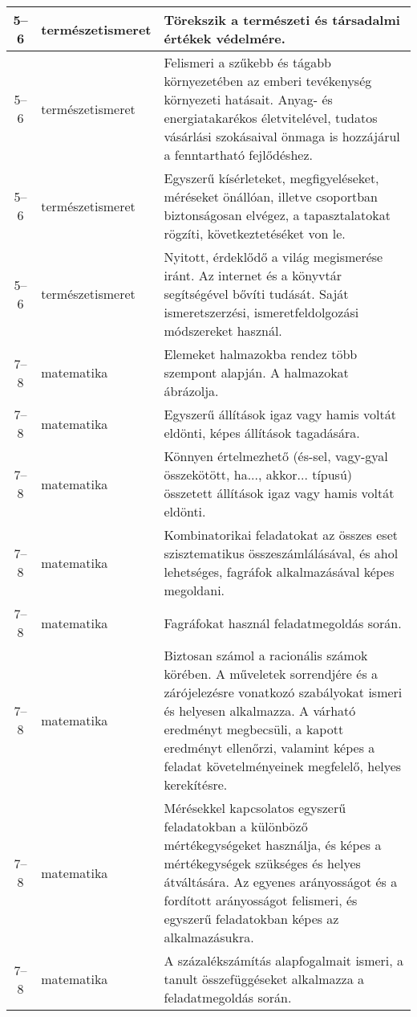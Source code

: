 \begin{small}
\begin{longtable}{c | p{2cm} |  p{11cm} }
              5--6 & természet\-ismeret & Törekszik a természeti és társadalmi értékek védelmére. \\ \hline
              5--6 & természet\-ismeret & Felismeri a szűkebb és tágabb környezetében az emberi tevékenység környezeti hatásait. Anyag- és energiatakarékos életvitelével, tudatos vásárlási szokásaival önmaga is hozzájárul a fenntartható fejlődéshez. \\ \hline
              5--6 & természet\-ismeret & Egyszerű kísérleteket, megfigyeléseket, méréseket önállóan, illetve csoportban biztonságosan elvégez, a tapasztalatokat rögzíti, következtetéséket von le. \\ \hline
              5--6 & természet\-ismeret & Nyitott, érdeklődő a világ megismerése iránt. Az internet és a könyvtár segítségével bővíti tudását. Saját ismeretszerzési, ismeretfeldolgozási módszereket használ. \\ \hline
              7--8 & matematika & Elemeket halmazokba rendez több szempont alapján. A halmazokat ábrázolja. \\ \hline
              7--8 & matematika & Egyszerű állítások igaz vagy hamis voltát eldönti, képes állítások tagadására. \\ \hline
              7--8 & matematika & Könnyen értelmezhető (és-sel, vagy-gyal összekötött, ha..., akkor... típusú) összetett állítások igaz vagy hamis voltát eldönti. \\ \hline
              7--8 & matematika & Kombinatorikai feladatokat az összes eset szisztematikus összeszámlálásával, és ahol lehetséges, fagráfok alkalmazásával képes megoldani. \\ \hline
              7--8 & matematika & Fagráfokat használ feladatmegoldás során. \\ \hline
              7--8 & matematika & Biztosan számol a racionális számok körében. A műveletek sorrendjére és a zárójelezésre vonatkozó szabályokat ismeri és helyesen alkalmazza. A várható eredményt megbecsüli, a kapott  eredményt ellenőrzi, valamint képes a feladat követelményeinek megfelelő, helyes kerekítésre. \\ \hline
              7--8 & matematika & Mérésekkel kapcsolatos egyszerű feladatokban a különböző mértékegységeket használja, és képes a mértékegységek szükséges és helyes átváltására. Az egyenes arányosságot és a fordított arányosságot felismeri, és egyszerű feladatokban képes az alkalmazásukra.
 \\ \hline
              7--8 & matematika & A százalékszámítás alapfogalmait ismeri, a tanult összefüggéseket alkalmazza a  feladatmegoldás során. \\ \hline

\end{longtable}
\end{small}

